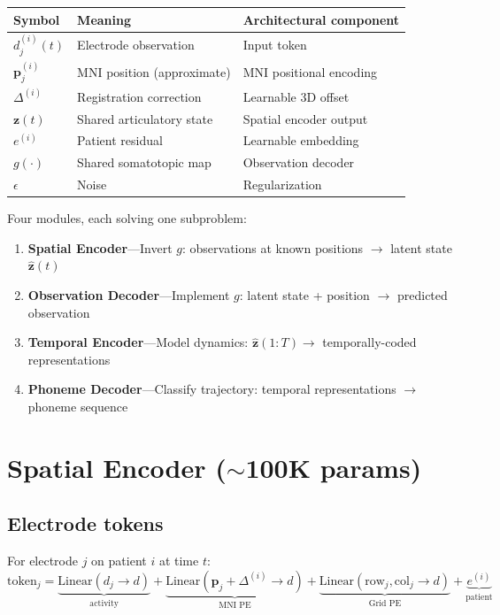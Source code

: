 \documentclass[11pt,letterpaper]{article}
\newcommand{\bfp}{\mathbf{p}}
\newcommand{\bfz}{\mathbf{z}}
\begin{document}
\begin{table}[h]\centering\small
\begin{tabular}{@{}lll@{}}
\toprule
\textbf{Symbol} & \textbf{Meaning} & \textbf{Architectural component} \\
\midrule
$d_j^{(i)}(t)$ & Electrode observation & Input token \\
$\bfp_j^{(i)}$ & MNI position (approximate) & MNI positional encoding \\
$\Delta^{(i)}$ & Registration correction & Learnable 3D offset \\
$\bfz(t)$ & Shared articulatory state & Spatial encoder output \\
$e^{(i)}$ & Patient residual & Learnable embedding \\
$g(\cdot)$ & Shared somatotopic map & Observation decoder \\
$\epsilon$ & Noise & Regularization \\
\bottomrule
\end{tabular}
\end{table}

Four modules, each solving one subproblem:
\begin{enumerate}[leftmargin=2em]
\item \textbf{Spatial Encoder}---Invert $g$: observations at known positions $\to$ latent state $\hat{\bfz}(t)$
\item \textbf{Observation Decoder}---Implement $g$: latent state + position $\to$ predicted observation
\item \textbf{Temporal Encoder}---Model dynamics: $\hat{\bfz}(1{:}T) \to$ temporally-coded representations
\item \textbf{Phoneme Decoder}---Classify trajectory: temporal representations $\to$ phoneme sequence
\end{enumerate}


\section{Spatial Encoder (${\sim}$100K params)}

\subsection{Electrode tokens}

For electrode $j$ on patient $i$ at time $t$:
\begin{equation}
\text{token}_j = \underbrace{\text{Linear}(d_j \to d)}_{\text{activity}} + \underbrace{\text{Linear}(\bfp_j + \Delta^{(i)} \to d)}_{\text{MNI PE}} + \underbrace{\text{Linear}(\text{row}_j, \text{col}_j \to d)}_{\text{Grid PE}} + \underbrace{e^{(i)}}_{\text{patient}}
\end{equation}
\end{document}
